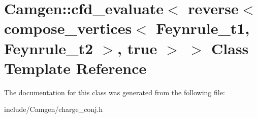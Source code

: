 \hypertarget{a00057}{}\section{Camgen\+:\+:cfd\+\_\+evaluate$<$ reverse$<$ compose\+\_\+vertices$<$ Feynrule\+\_\+t1, Feynrule\+\_\+t2 $>$, true $>$ $>$ Class Template Reference}
\label{a00057}


The documentation for this class was generated from the following file\+:\begin{DoxyCompactItemize}
\item 
include/\+Camgen/charge\+\_\+conj.\+h\end{DoxyCompactItemize}
